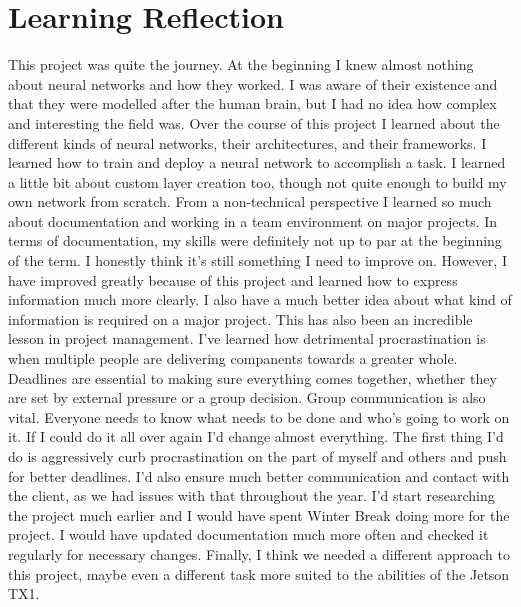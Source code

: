 \documentclass[onecolumn, draftclsnofoot,10pt, compsoc]{IEEEtran}
\begin{document}
\section{Learning Reflection}
This project was quite the journey.
At the beginning I knew almost nothing about neural networks and how they worked.
I was aware of their existence and that they were modelled after the human brain, but I had no idea how complex and interesting the field was.
Over the course of this project I learned about the different kinds of neural networks, their architectures, and their frameworks.
I learned how to train and deploy a neural network to accomplish a task. 
I learned a little bit about custom layer creation too, though not quite enough to build my own network from scratch.
\newline\newline
From a non-technical perspective I learned so much about documentation and working in a team environment on major projects.
In terms of documentation, my skills were definitely not up to par at the beginning of the term.
I honestly think it's still something I need to improve on.
However, I have improved greatly because of this project and learned how to express information much more clearly.
I also have a much better idea about what kind of information is required on a major project. 
This has also been an incredible lesson in project management. 
I've learned how detrimental procrastination is when multiple people are delivering companents towards a greater whole.
Deadlines are essential to making sure everything comes together, whether they are set by external pressure or a group decision.
Group communication is also vital.
Everyone needs to know what needs to be done and who's going to work on it.
\newline\newline
If I could do it all over again I'd change almost everything.
The first thing I'd do is aggressively curb procrastination on the part of myself and others and push for better deadlines.
I'd also ensure much better communication and contact with the client, as we had issues with that throughout the year.
I'd start researching the project much earlier and I would have spent Winter Break doing more for the project.
I would have updated documentation much more often and checked it regularly for necessary changes.
Finally, I think we needed a different approach to this project, maybe even a different task more suited to the abilities of the Jetson TX1.
\end{document}
